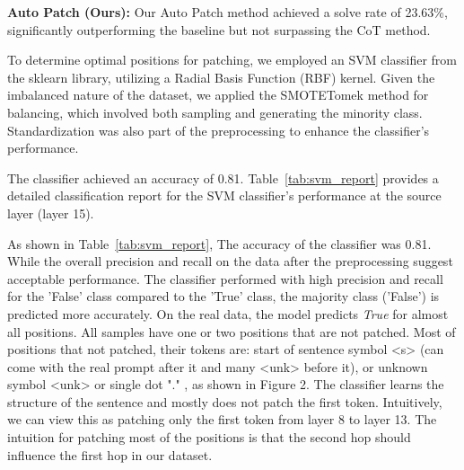 \documentclass[11pt]{article}
\begin{document}
\textbf{Auto Patch (Ours):} Our Auto Patch method achieved a solve rate of 23.63\%, significantly outperforming the baseline but not surpassing the CoT method.

To determine optimal positions for patching, we employed an SVM classifier from the sklearn library, utilizing a Radial Basis Function (RBF) kernel. Given the imbalanced nature of the dataset, we applied the SMOTETomek method for balancing, which involved both sampling and generating the minority class. Standardization was also part of the preprocessing to enhance the classifier's performance.

The classifier achieved an accuracy of 0.81. Table~\ref{tab:svm_report} provides a detailed classification report for the SVM classifier's performance at the source layer (layer 15).

\begin{table}[h!]
    \centering
    \caption{Classification Report for the classifier}
    \label{tab:svm_report}
\end{table}

As shown in Table~\ref{tab:svm_report}, The accuracy of the classifier was 0.81. While the overall precision and recall on the data after the preprocessing suggest acceptable performance. The classifier performed with high precision and recall for the 'False' class compared to the 'True' class, the majority class ('False') is predicted more accurately. On the real data, the model predicts \textit{True} for almost all positions. All samples have one or two positions that are not patched. Most of positions that not patched, their tokens are: start of sentence symbol <s> (can come with the real prompt after it and many <unk> before it), or unknown symbol <unk> or single dot "." , as shown in Figure 2. The classifier learns the structure of the sentence and mostly does not patch the first token. Intuitively, we can view this as patching only the first token from layer 8 to layer 13. The intuition for patching most of the positions is that the second hop should influence the first hop in our dataset.
\end{document}
